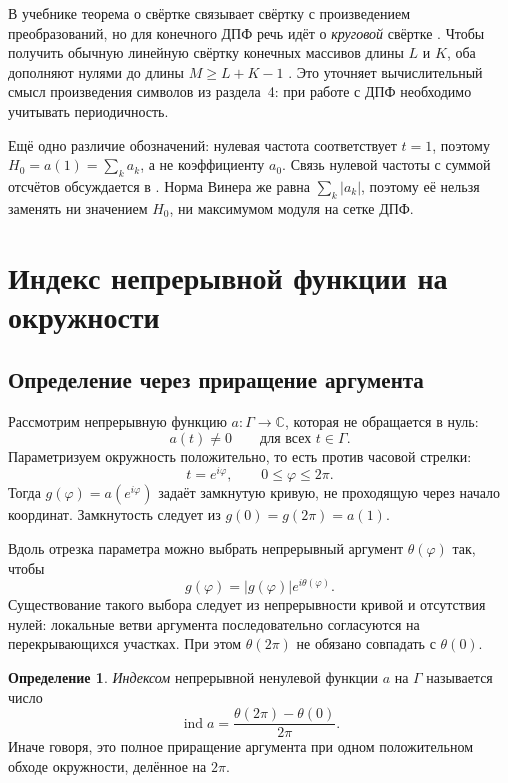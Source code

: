 \documentclass[12pt,a4paper]{article}
\theoremstyle{definition}
\newtheorem{definition}{Определение}
\theoremstyle{remark}
\newcommand{\CC}{\mathbb{C}}
\DeclareMathOperator{\ind}{ind}
\begin{document}
В учебнике теорема о свёртке связывает свёртку с произведением
преобразований, но для конечного ДПФ речь идёт о
\emph{круговой} свёртке
\cite[\S\,4.6.6, с.~298]{GW2012}.
Чтобы получить обычную линейную свёртку конечных массивов длины
$L$ и $K$, оба дополняют нулями до длины $M\geqslant L+K-1$
\cite[\S\,4.6.6, с.~300]{GW2012}.
Это уточняет вычислительный смысл произведения символов
из раздела~4: при работе с ДПФ необходимо учитывать периодичность.

Ещё одно различие обозначений: нулевая частота соответствует
$t=1$, поэтому $H_0=a(1)=\sum_k a_k$, а не коэффициенту $a_0$.
Связь нулевой частоты с суммой отсчётов обсуждается в
\cite[\S\,4.6.5, с.~294]{GW2012}.
Норма Винера же равна $\sum_k|a_k|$, поэтому её нельзя заменять
ни значением $H_0$, ни максимумом модуля на сетке ДПФ.

\section{Индекс непрерывной функции на окружности}

\subsection{Определение через приращение аргумента}

Рассмотрим непрерывную функцию $a\colon\Gamma\to\CC$, которая не
обращается в нуль:
\[
  a(t)\ne0\qquad\text{для всех }t\in\Gamma.
\]
Параметризуем окружность положительно, то есть против часовой стрелки:
\[
  t=e^{i\varphi},\qquad0\leqslant\varphi\leqslant2\pi.
\]
Тогда $g(\varphi)=a(e^{i\varphi})$ задаёт замкнутую кривую, не
проходящую через начало координат. Замкнутость следует из
$g(0)=g(2\pi)=a(1)$.

Вдоль отрезка параметра можно выбрать непрерывный аргумент
$\theta(\varphi)$ так, чтобы
\[
  g(\varphi)=|g(\varphi)|e^{i\theta(\varphi)}.
\]
Существование такого выбора следует из непрерывности кривой и отсутствия
нулей: локальные ветви аргумента последовательно согласуются на
перекрывающихся участках. При этом $\theta(2\pi)$ не обязано совпадать
с $\theta(0)$.

\begin{definition}
\emph{Индексом} непрерывной ненулевой функции $a$ на $\Gamma$ называется
число
\[
  \boxed{\ind a=\frac{\theta(2\pi)-\theta(0)}{2\pi}}.
\]
Иначе говоря, это полное приращение аргумента при одном положительном
обходе окружности, делённое на $2\pi$.
\end{definition}
\end{document}
